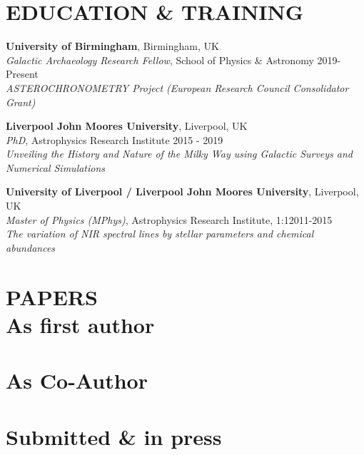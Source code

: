 \documentclass[margin]{res}
\begin{document}
\begin{resume}
\section{EDUCATION \& TRAINING}
\textbf{University of Birmingham}, Birmingham, UK\\
{\sl Galactic Archaeology Research Fellow}, School of Physics \& Astronomy \hfill 2019-Present\\
\emph{ASTEROCHRONOMETRY Project (European Research Council Consolidator Grant)}

\textbf{Liverpool John Moores University}, Liverpool, UK\\
{\sl PhD}, Astrophysics Research Institute \hfill 2015 - 2019\\
\emph{Unveiling the History and Nature of the Milky Way using Galactic Surveys and Numerical Simulations}

\textbf{University of Liverpool / Liverpool John Moores University}, Liverpool, UK\\
{\sl Master of Physics (MPhys)}, Astrophysics Research Institute, 1:1\hfill 2011-2015
\\
\emph{The variation of NIR spectral lines by stellar parameters and chemical abundances}



\section{PAPERS\\ As first author}
\begin{itemize}

\end{itemize}
\section{As Co-Author}
\begin{itemize}

\end{itemize}
\section{Submitted \& in press}
\begin{itemize}

\end{itemize}

\end{resume}
\end{document}
